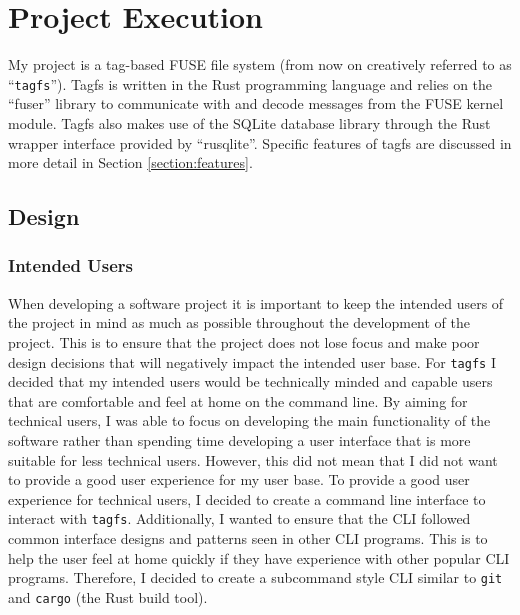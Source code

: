 \chapter{Project Execution}
\vspace{1cm}

My project is a tag-based FUSE file system (from now on creatively referred to
as ``\texttt{tagfs}''). Tagfs is written in the Rust programming language and
relies on the ``fuser'' library to communicate with and decode messages from
the FUSE kernel module. Tagfs also makes use of the SQLite database library
through the Rust wrapper interface provided by ``rusqlite''. Specific features
of tagfs are discussed in more detail in Section \ref{section:features}.

\section{Design}

\subsection{Intended Users}


When developing a software project it is important to keep the intended users
of the project in mind as much as possible throughout the development of the
project. This is to ensure that the project does not lose focus and make poor
design decisions that will negatively impact the intended user base. For
\texttt{tagfs} I decided that my intended users would be technically
minded and capable users that are comfortable and feel at home on the command
line. By aiming for technical users, I was able to focus on developing the
main functionality of the software rather than spending time developing a user
interface that is more suitable for less technical users. However, this did not
mean that I did not want to provide a good user experience for my user base. To
provide a good user experience for technical users, I decided to create a
command line interface to interact with \texttt{tagfs}. Additionally, I wanted
to ensure that the CLI followed common interface designs and patterns seen in
other CLI programs. This is to help the user feel at home quickly if they have
experience with other popular CLI programs. Therefore, I decided to create a
subcommand style CLI similar to \texttt{git} and \texttt{cargo} (the Rust build
tool).

